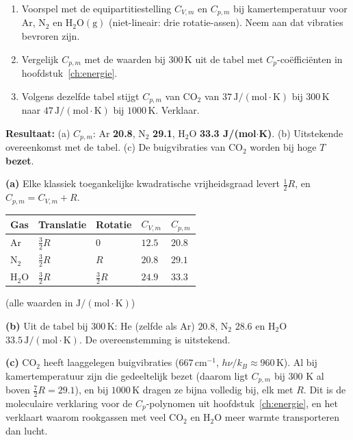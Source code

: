 \begin{oefening}
\begin{enumerate}
\item[(a)]
  Voorspel met de equipartitiestelling \(C_{V,m}\) en \(C_{p,m}\) bij kamertemperatuur voor Ar, \(\mathrm{N_2}\) en \(\mathrm{H_2O(g)}\) (niet-lineair: drie rotatie-assen). Neem aan dat vibraties bevroren zijn.
\item[(b)]
  Vergelijk \(C_{p,m}\) met de waarden bij \(300\,\mathrm{K}\) uit de tabel met \(C_p\)-coëfficiënten in hoofdstuk~\ref{ch:energie}.
\item[(c)]
  Volgens dezelfde tabel stijgt \(C_{p,m}\) van \(\mathrm{CO_2}\) van \(37\,\mathrm{J/(mol\cdot K)}\) bij \(300\,\mathrm{K}\) naar \(47\,\mathrm{J/(mol\cdot K)}\) bij \(1000\,\mathrm{K}\). Verklaar.
\end{enumerate}
\end{oefening}
\begin{oplossing}
\textbf{Resultaat:} (a) \(C_{p,m}\): Ar \textbf{20.8}, N\ensuremath{_{2}} \textbf{29.1}, H\ensuremath{_{2}}O \textbf{33.3 J/(mol\ensuremath{\cdot{}}K)}. (b) Uitstekende overeenkomst met de tabel. (c) De buigvibraties van CO\ensuremath{_{2}} worden bij hoge \(T\) \textbf{bezet}.

\textbf{(a)} Elke klassiek toegankelijke kwadratische vrijheidsgraad levert \(\frac{1}{2}R\), en \(C_{p,m} = C_{V,m} + R\).

\begin{center}
\begin{tabular}{lllll}
\toprule
Gas & Translatie & Rotatie & \(C_{V,m}\) & \(C_{p,m}\) \\
\midrule
Ar & \(\frac{3}{2}R\) & 0 & \(12.5\) & \(20.8\) \\
\(\mathrm{N_2}\) & \(\frac{3}{2}R\) & \(R\) & \(20.8\) & \(29.1\) \\
\(\mathrm{H_2O}\) & \(\frac{3}{2}R\) & \(\frac{3}{2}R\) & \(24.9\) & \(33.3\) \\
\bottomrule
\end{tabular}
\end{center}

(alle waarden in \(\mathrm{J/(mol\cdot K)}\))

\textbf{(b)} Uit de tabel bij \(300\,\mathrm{K}\): He (zelfde als Ar) \(20.8\), \(\mathrm{N_2}\) \(28.6\) en \(\mathrm{H_2O}\) \(33.5\,\mathrm{J/(mol\cdot K)}\). De overeenstemming is uitstekend.

\textbf{(c)} \(\mathrm{CO_2}\) heeft laaggelegen buigvibraties (\(667\,\mathrm{cm^{-1}}\), \(h\nu/k_B \approx 960\,\mathrm{K}\)). Al bij kamertemperatuur zijn die gedeeltelijk bezet (daarom ligt \(C_{p,m}\) bij 300 K al boven \(\frac{7}{2}R = 29.1\)), en bij \(1000\,\mathrm{K}\) dragen ze bijna volledig bij, elk met \(R\). Dit is de moleculaire verklaring voor de \(C_p\)-polynomen uit hoofdstuk~\ref{ch:energie}, en het verklaart waarom rookgassen met veel \(\mathrm{CO_2}\) en \(\mathrm{H_2O}\) meer warmte transporteren dan lucht.
\end{oplossing}

